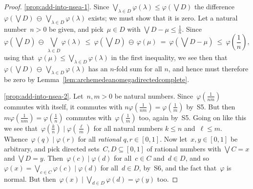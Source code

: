 \documentclass[a4paper, onecolumn, accepted=2020-12-22]{quantumarticle}
\newcommand{\mult}{\mathop{\circ}}
\newcommand{\commu}{\mathrel{\lvert}}
\theoremstyle{definition}
\begin{document}
\begin{proof}
\ref{prop:add-into-nsea-1}.
Since
$\bigvee_{\lambda\in D} \varphi(\lambda)
\leq 
\varphi(\bigvee D)$
the difference
$\varphi(\bigvee D)
 \,\ominus\, \bigvee_{\lambda\in D} \varphi(\lambda)$ 
exists;
we must show that it is zero.
Let a natural number~$n>0$ be given,
    and pick~$\mu\in D$ with $\bigvee D- \mu \leq \frac{1}{n}$. 
  Since
\begin{equation*}
    \textstyle
\varphi(\bigvee D)
 \,\ominus\, \bigvee_{\lambda\in D} \varphi(\lambda)
\ \leq\ 
\varphi(\bigvee D)
    \,\ominus\, \varphi(\mu)
\ =\ 
\varphi(\bigvee D-\mu)
    \ \leq \ \varphi(\frac{1}{n}),
\end{equation*}
using that~$\varphi(\mu)\leq \bigvee_{\lambda\in D} \varphi(\lambda)$
in the first inequality,
we see then that
$\varphi(\bigvee D)
 \,\ominus\, \bigvee_{\lambda\in D} \varphi(\lambda)$
    has an $n$-fold sum for all $n$,
    and hence must therefore be zero by Lemma~\ref{lem:archemedeanomegadirectedcomplete}.

\ref{prop:add-into-nsea-2}.
Let~$n,m>0$ be natural numbers.
    Since~$\varphi(\frac{1}{nm})$
    commutes with itself,
    it commutes with $n\varphi(\frac{1}{nm}) = \varphi(\frac{1}{m})$
    by~S5. But then $m\varphi(\frac{1}{nm}) = \varphi(\frac{1}{n})$
    commutes with~$\varphi(\frac{1}{m})$ too,
    again by~S5.
Going on like this
we see that~$\varphi(\frac{k}{n})\commu \varphi(\frac{\ell}{m})$ 
for all natural numbers $k\leq n$ and~$\ell \leq m$.
Whence~$\varphi(q)\commu \varphi(r)$ for all \emph{rational}
$q,r\in [0,1]$.
Now let~$x,y\in [0,1]$ be arbitrary,
    and pick directed sets~$C,D\subseteq[0,1]$  of rational numbers with $\bigvee C=x$
and $\bigvee D = y$.
Then~$\varphi(c)\commu \varphi(d)$ for all~$c\in C$ and~$d\in D$,
and so~$\varphi(x)=\bigvee_{c\in C} \varphi(c)\commu \varphi(d)$
for all~$d\in D$, by~S6, and the fact that~$\varphi$ is normal.
But then~$\varphi(x)\commu \bigvee_{d\in D}\varphi(d)=\varphi(y)$ too.




\end{proof}
\end{document}
